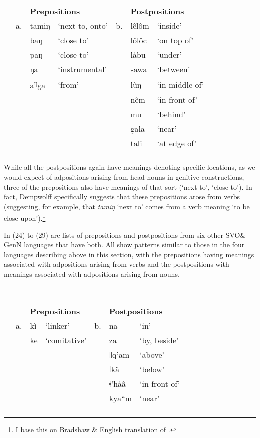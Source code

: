 \documentclass[output=paper]{langsci/langscibook}
\begin{document}
\begin{table}
\begin{tabularx}{\textwidth}{XXXXXXX} &  & \multicolumn{2}{X}{\bfseries Prepositions} &  & \multicolumn{2}{X}{\bfseries Postpositions}\\
\lsptoprule
& a. & tamiŋ & ‘next to, onto’ & b. & lêlôm & ‘inside’\\
&  & baŋ & ‘close to’ &  & lôlôc & ‘on top of’\\
&  & paŋ & ‘close to’ &  & làbu & ‘under’\\
&  & ŋa & ‘instrumental’ &  & sawa & ‘between’\\
&  & a\textsuperscript{ŋ}ga & ‘from’ &  & lùŋ & ‘in middle of’\\
&  &  &  &  & nêm & ‘in front of’\\
&  &  &  &  & mu & ‘behind’\\
&  &  &  &  & gala & ‘near’\\
&  &  &  &  & tali & ‘at edge of’\\
\lspbottomrule
\end{tabularx}
\end{table}

While all the postpositions again have meanings denoting specific locations, as we would expect of adpositions arising from head nouns in genitive constructions, three of the prepositions also have meanings of that sort (‘next to’, ‘close to’). In fact, Dempwolff specifically suggests that these prepositions arose from verbs (suggesting, for example, that \textit{tamiŋ} ‘next to’ comes from a verb meaning ‘to be close upon’).\footnote{I base this on Bradshaw \&  English translation of \citet{Dempwolff1939}.}

In (24) to (29) are lists of prepositions and postpositions from six other SVO\& GenN languages that have both. All show patterns similar to those in the four languages describing above in this section, with the prepositions having meanings associated with adpositions arising from verbs and the postpositions with meanings associated with adpositions arising from nouns.

\begin{table}
\\
\begin{tabularx}{\textwidth}{XXXXXXX}
\lsptoprule
&  & \multicolumn{2}{X}{\bfseries Prepositions} &  & \multicolumn{2}{X}{\bfseries Postpositions}\\
& a. & kì & ‘linker’ & b. & na & ‘in’\\
&  & ke & ‘comitative’ &  & za & ‘by, beside’\\
&  &  &  &  & ǀǀq'am & ‘above’\\
&  &  &  &  & ǂkȁ & ‘below’\\
&  &  &  &  & ǂ’hàã & ‘in front of’\\
&  &  &  &  & kya“m & ‘near’\\
\lspbottomrule
\end{tabularx}
\end{table}
\end{document}

